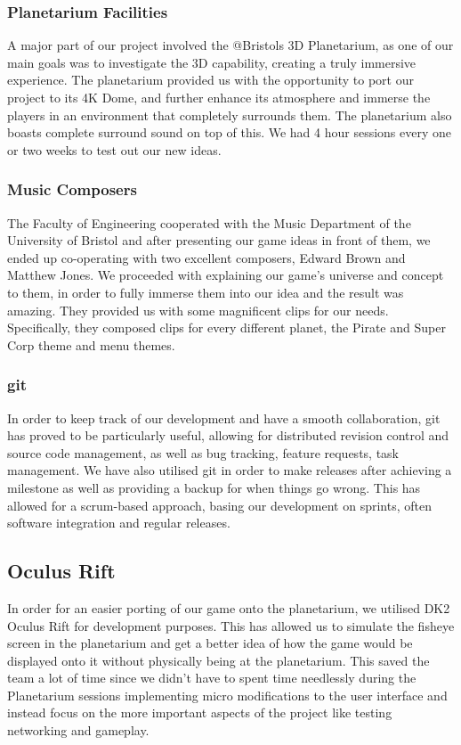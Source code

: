 \documentclass[11pt,a4paper]{article}
\begin{document}
 \subsubsection{  Planetarium Facilities}
 A major part of our project involved the @Bristols 3D Planetarium, as one of our main goals was to investigate the 3D capability, creating a truly immersive experience. The planetarium provided us with the opportunity to port our project to its 4K Dome, and further enhance its atmosphere and immerse the players in an environment that completely surrounds them. The planetarium also boasts complete surround sound on top of this. We had 4 hour sessions every one or two weeks to test out our new ideas.

 \subsubsection{ Music Composers}
 The Faculty of Engineering cooperated with the Music Department of the University of Bristol and after presenting our game ideas in front of them, we ended up co-operating with two excellent composers, Edward Brown and Matthew Jones. We proceeded with explaining our game's universe and concept to them, in order to fully immerse them into our idea and the result was amazing. They provided us with some magnificent clips for our needs. Specifically, they composed clips for every different planet, the Pirate and Super Corp theme and menu themes.


 \subsubsection{git}
 In order to keep track of our development and have a smooth collaboration, git has proved to be particularly useful, allowing for distributed revision control and source code management, as well as bug tracking, feature requests, task management. We have also utilised git in order to make releases after achieving a milestone as well as providing a backup for when things go wrong. This has allowed for a scrum-based approach, basing our development on sprints, often software integration and regular releases.


 \subsection{Oculus Rift} 
 In order for an easier porting of our game onto the planetarium, we utilised DK2 Oculus Rift for development purposes. This has allowed us to simulate the fisheye screen in the planetarium and get a better idea of how the game would be displayed onto it without physically being at the planetarium. This saved the team a lot of time since we didn’t have to spent time needlessly during the Planetarium sessions implementing micro modifications to the user interface and instead focus on the more important aspects of the project like testing networking and gameplay.
\end{document}
